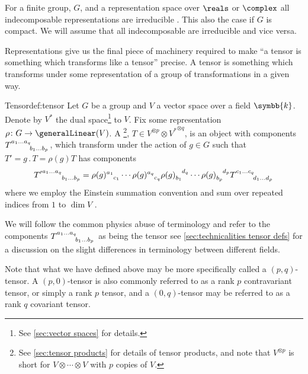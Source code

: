 \documentclass[fleqn]{NotesClass}
\renewcommand{\field}{\symbb{k}}
\newcommand{\action}{\mathbin{.}}
\newcommand{\dual}[1]{{#1^{*}}}
\begin{document}
    For a finite group, \(G\), and a representation space over \(\reals\) or \(\complex\) all indecomposable representations are irreducible \cite[98]{hamermesh}.
    This also the case if \(G\) is compact.
    We will assume that all indecomposable are irreducible and vice versa.
    
    Representations give us the final piece of machinery required to make \enquote{a tensor is something which transforms like a tensor} precise.
    A tensor is something which transforms under some representation of a group of transformations in a given way.
    \begin{dfn}{Tensor}{def:tensor}
        Let \(G\) be a group and \(V\) a vector space over a field \(\field\).
        Denote by \(\dual{V}\) the dual space\footnote{See \cref{sec:vector spaces} for details.} to \(V\).
        Fix some representation \(\rho \colon G \to \generalLinear(V)\).
        A \footnote{See \cref{sec:tensor products} for details of tensor products, and note that \(V^{\otimes p}\) is short for \(V \otimes \dotsb \otimes V\) with \(p\) copies of \(V\).}, \(T \in V^{\otimes p} \otimes \dual{V}^{\otimes q}\), is an object with components \(\tensor{T}{^{a_1\dotso a_q}_{b_1 \dotso b_p}}\), which transform under the action of \(g \in G\) such that \(T' = g \action T = \rho(g)T\) has components
        \begin{equation*}
            \tensor{{T'}}{^{a_1\dotso a_q}_{b_1 \dotso b_p}} = \tensor{\rho(g)}{^{a_1}_{c_1}} \dotsm \tensor{\rho(g)}{^{a_q}_{c_q}} \tensor{\rho(g)}{_{b_1}^{d_q}} \dotsm \tensor{\rho(g)}{_{b_p}^{d_p}} \tensor{T}{^{c_1\dotso c_q}_{d_1 \dotso d_p}}
        \end{equation*}
        where we employ the Einstein summation convention and sum over repeated indices from \(1\) to \(\dim V\) \cite[18]{cvitanovic}.
    \end{dfn}
    
    We will follow the common physics abuse of terminology and refer to the components \(\tensor{T}{^{a_1\dotso a_q}_{b_1\dotso b_p}}\) as being the tensor see \cref{sec:technicalities tensor defs} for a discussion on the slight differences in terminology between different fields.
    
    Note that what we have defined above may be more specifically called a \((p, q)\)-tensor.
    A \((p, 0)\)-tensor is also commonly referred to as a rank \(p\) contravariant tensor, or simply a rank \(p\) tensor, and a \((0, q)\)-tensor may be referred to as a rank \(q\) covariant tensor.
    
\end{document}
